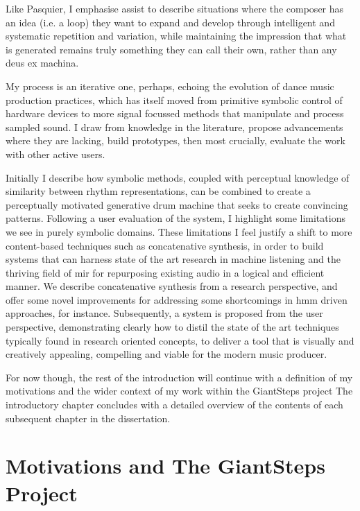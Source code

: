 Like Pasquier, I emphasise assist to describe situations where the composer has an idea (i.e. a loop) they want to expand and develop through intelligent and systematic repetition and variation, while maintaining the impression that what is generated remains truly something they can call their own, rather than any deus ex machina.

My process is an iterative one, perhaps, echoing the evolution of dance music production practices, which has itself moved from primitive symbolic control of hardware devices to more signal focussed methods that manipulate and process sampled sound. I draw from knowledge in the literature, propose advancements where they are lacking, build prototypes, then most crucially, evaluate the work with other active users. 

Initially I describe how symbolic methods, coupled with perceptual knowledge of similarity between rhythm representations, can be combined to create a perceptually motivated generative drum machine that seeks to create convincing patterns. Following a user evaluation of the system, I highlight some limitations we see in purely symbolic domains. These limitations I feel justify a shift to more content-based techniques such as concatenative synthesis, in order to build systems that can harness state of the art research in machine listening and the thriving field of \acrfull{mir} for repurposing existing audio in a logical and efficient manner. We describe concatenative synthesis from a research perspective, and offer some novel improvements for addressing some shortcomings in \acrfull{hmm} driven approaches, for instance. Subsequently, a system is proposed from the user perspective, demonstrating clearly how to distil the state of the art techniques typically found in research oriented concepts, to deliver a tool that is visually and creatively appealing, compelling and viable for the modern music producer. 

For now though, the rest of the introduction will continue with a definition of my motivations and the wider context of my work within the GiantSteps project The introductory chapter concludes with a detailed overview of the contents of each subsequent chapter in the dissertation.

\section{Motivations and The GiantSteps Project}

